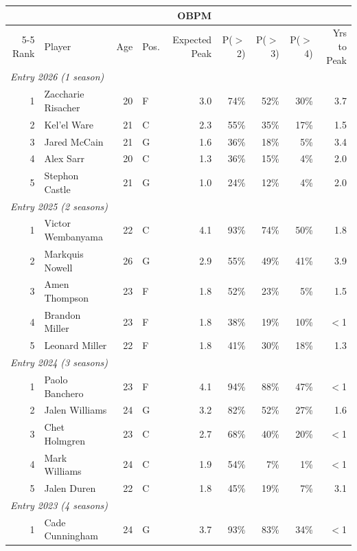 \begin{table}[htbp]
  \centering\small
  \begin{tabular}{rlrlrrrrr}
    \toprule
     & & & & OBPM & & & & \\
    \cmidrule(lr){5-5}
    Rank & Player & Age & Pos. & Expected Peak & P($>$2) & P($>$3) & P($>$4) & Yrs to Peak \\
    \midrule
    \multicolumn{9}{l}{\textit{Entry 2026 (1 season)}} \\
    \midrule
    1 & Zaccharie Risacher & 20 & F & 3.0 & 74\% & 52\% & 30\% & 3.7 \\
    2 & Kel'el Ware & 21 & C & 2.3 & 55\% & 35\% & 17\% & 1.5 \\
    3 & Jared McCain & 21 & G & 1.6 & 36\% & 18\% & 5\% & 3.4 \\
    4 & Alex Sarr & 20 & C & 1.3 & 36\% & 15\% & 4\% & 2.0 \\
    5 & Stephon Castle & 21 & G & 1.0 & 24\% & 12\% & 4\% & 2.0 \\
    \midrule[0.4pt]
    \multicolumn{9}{l}{\textit{Entry 2025 (2 seasons)}} \\
    \midrule
    1 & Victor Wembanyama & 22 & C & 4.1 & 93\% & 74\% & 50\% & 1.8 \\
    2 & Markquis Nowell & 26 & G & 2.9 & 55\% & 49\% & 41\% & 3.9 \\
    3 & Amen Thompson & 23 & F & 1.8 & 52\% & 23\% & 5\% & 1.5 \\
    4 & Brandon Miller & 23 & F & 1.8 & 38\% & 19\% & 10\% & $<$1 \\
    5 & Leonard Miller & 22 & F & 1.8 & 41\% & 30\% & 18\% & 1.3 \\
    \midrule[0.4pt]
    \multicolumn{9}{l}{\textit{Entry 2024 (3 seasons)}} \\
    \midrule
    1 & Paolo Banchero & 23 & F & 4.1 & 94\% & 88\% & 47\% & $<$1 \\
    2 & Jalen Williams & 24 & G & 3.2 & 82\% & 52\% & 27\% & 1.6 \\
    3 & Chet Holmgren & 23 & C & 2.7 & 68\% & 40\% & 20\% & $<$1 \\
    4 & Mark Williams & 24 & C & 1.9 & 54\% & 7\% & 1\% & $<$1 \\
    5 & Jalen Duren & 22 & C & 1.8 & 45\% & 19\% & 7\% & 3.1 \\
    \midrule[0.4pt]
    \multicolumn{9}{l}{\textit{Entry 2023 (4 seasons)}} \\
    \midrule
    1 & Cade Cunningham & 24 & G & 3.7 & 93\% & 83\% & 34\% & $<$1 \\

\end{tabular}
\end{table}
